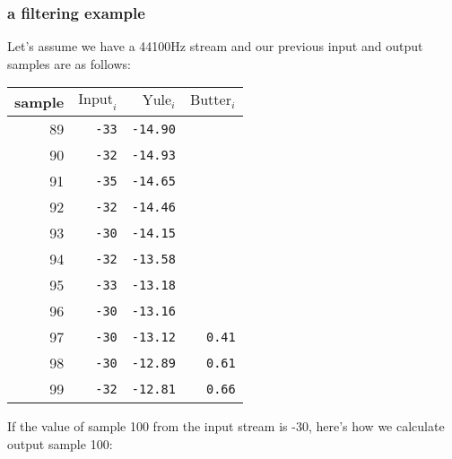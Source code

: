 \subsubsection{a filtering example}
Let's assume we have a 44100Hz stream and our previous input and output
samples are as follows:
\begin{table}[h]
{
\begin{tabular}{|r|r|r|r|}
\hline
sample & $\text{Input}_i$ & $\text{Yule}_i$ & $\text{Butter}_i$ \\
\hline
89 & \texttt{-33} & \texttt{-14.90} & \\
90 & \texttt{-32} & \texttt{-14.93} & \\
91 & \texttt{-35} & \texttt{-14.65} & \\
92 & \texttt{-32} & \texttt{-14.46} & \\
93 & \texttt{-30} & \texttt{-14.15} & \\
94 & \texttt{-32} & \texttt{-13.58} & \\
95 & \texttt{-33} & \texttt{-13.18} & \\
96 & \texttt{-30} & \texttt{-13.16} & \\
97 & \texttt{-30} & \texttt{-13.12} & \texttt{0.41} \\
98 & \texttt{-30} & \texttt{-12.89} & \texttt{0.61} \\
99 & \texttt{-32} & \texttt{-12.81} & \texttt{0.66} \\
\hline
\end{tabular}
}
\end{table}
\par
\noindent
If the value of sample 100 from the input stream is -30,
here's how we calculate output sample 100:
